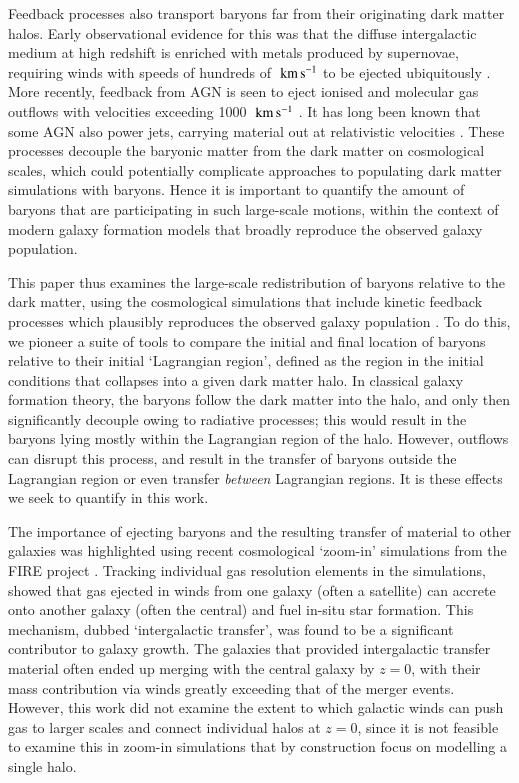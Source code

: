 Feedback processes also transport baryons far from their originating dark
matter halos. Early observational evidence for this was that the diffuse
intergalactic medium at high redshift is enriched with metals produced by
supernovae, requiring winds with speeds of hundreds of $\;{\rm km}\,{\rm s}^{-1}{}$ to be ejected
ubiquitously \citep[e.g.][]{Aguirre2001, Springel2003, Oppenheimer2006}. More
recently, feedback from AGN is seen to eject ionised and molecular gas
outflows with velocities exceeding 1000 $\;{\rm km}\,{\rm s}^{-1}{}$
\citep[e.g.][]{Sturm2001, Greene2012, Maiolino2012, Zakamska2016}. It has
long been known that some AGN also power jets, carrying material out at
relativistic velocities \citep{Fabian2012}. These processes decouple the
baryonic matter from the dark matter on cosmological scales, which could
potentially complicate approaches to populating dark matter simulations with
baryons. Hence it is important to quantify the amount of baryons that are
participating in such large-scale motions, within the context of modern
galaxy formation models that broadly reproduce the observed galaxy
population.

This paper thus examines the large-scale redistribution of baryons relative to the
dark matter, using the \simba{} cosmological simulations that include kinetic
feedback processes which plausibly reproduces the observed galaxy population
\citep{Dave2019}. To do this, we pioneer a suite of tools to compare the
initial and final location of baryons relative to their initial `Lagrangian
region', defined as the region in the initial conditions that collapses into
a given dark matter halo. In classical galaxy formation theory, the baryons
follow the dark matter into the halo, and only then significantly decouple
owing to radiative processes; this would result in the baryons lying mostly
within the Lagrangian region of the halo. However, outflows can disrupt this
process, and result in the transfer of baryons outside the Lagrangian region
or even transfer \emph{between} Lagrangian regions. It is these effects we
seek to quantify in this work.

The importance of ejecting baryons and the resulting transfer of material to
other galaxies was highlighted using recent cosmological `zoom-in'
simulations from the FIRE project \citep{Hopkins2014,Hopkins2018}. Tracking
individual gas resolution elements in the simulations,
\citet{AnglesAlcazar2017} showed that gas ejected in winds from one galaxy
(often a satellite) can accrete onto another galaxy (often the central) and
fuel in-situ star formation. This mechanism, dubbed `intergalactic transfer',
was found to be a significant contributor to galaxy growth. The galaxies that
provided intergalactic transfer material often ended up merging with the
central galaxy by $z=0$, with their mass contribution via winds greatly
exceeding that of the merger events. However, this work did not examine the
extent to which galactic winds can push gas to larger scales and connect
individual halos at $z=0$, since it is not feasible to examine this in
zoom-in simulations that by construction focus on modelling a single halo.

